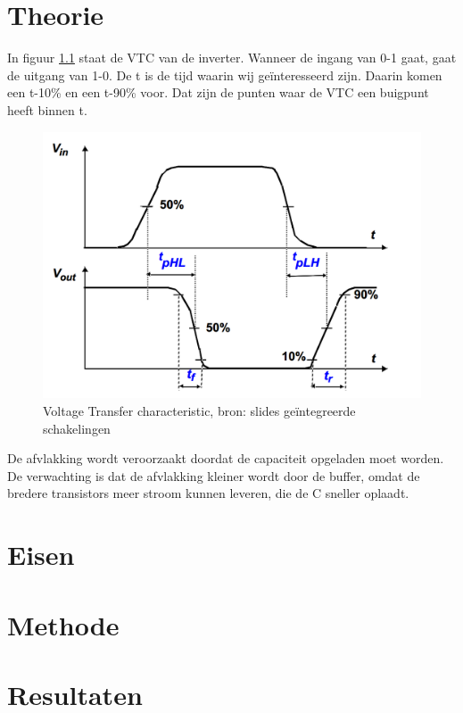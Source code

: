 \documentclass{report}
\begin{document}
\chapter{Theorie}
In figuur \ref{Th1} staat de VTC van de inverter. Wanneer de ingang van 0-1 gaat, gaat de uitgang van 1-0. De t is de tijd waarin wij geïnteresseerd zijn. Daarin komen een t-10\% en een t-90\% voor. Dat zijn de punten waar de VTC een buigpunt heeft binnen t. 
\begin{figure} [h!]
\includegraphics [scale= 0.3] {inputfiles/vtc}
\caption{Voltage Transfer characteristic, bron: slides geïntegreerde schakelingen}
\label{Th1}
\end{figure}
De afvlakking wordt veroorzaakt doordat de capaciteit opgeladen moet worden. De verwachting is dat de afvlakking kleiner wordt door de buffer, omdat de bredere transistors meer stroom kunnen leveren, die de C sneller oplaadt. 



\chapter{Eisen}


\chapter{Methode}


\chapter{Resultaten}
%
\end{document}
